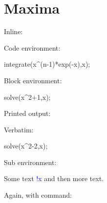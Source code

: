 \documentclass[11pt]{article}
\begin{document}
\section*{Maxima}

Inline:  

Code environment:
\begin{maximacode}
integrate(x^(n-1)*exp(-x),x);
\end{maximacode}

Block environment:
\begin{maximablock}
solve(x^2+1,x);
\end{maximablock}
Printed output:
\printpythontex[verbatim]

Verbatim:
\begin{maximaverbatim}
solve(x^2-2,x);
\end{maximaverbatim}


Sub environment:
\begin{maximasub}
Some text \textcolor{blue}{!{x}} and then more text.
\end{maximasub}

Again, with command:  
\end{document}
